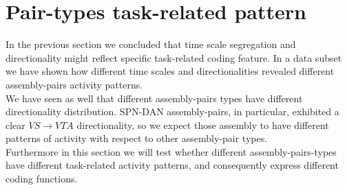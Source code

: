  \section{Pair-types task-related pattern}
 \label{sec:TaskResp}
In the previous section we concluded that time scale segregation and directionality might reflect specific task-related coding feature. In a data subset we have shown how different time scales and directionalities revealed different assembly-pairs activity patterns.\\We have seen as well that different assembly-pairs types have different directionality distribution. SPN-DAN assembly-pairs, in particular, exhibited a clear $VS\rightarrow VTA$ directionality, so we expect those assembly to have different patterns of activity with respect to other assembly-pair types.\\Furthermore in this section we will test whether different assembly-pairs-types have different task-related activity patterns, and consequently express different coding functions.\\
